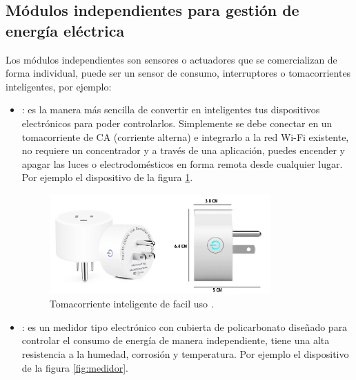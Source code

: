 \subsection{Módulos independientes para gestión de energía eléctrica}
Los módulos independientes son sensores o actuadores  que se comercializan de forma individual, puede ser un sensor de consumo, interruptores o tomacorrientes inteligentes, por ejemplo: 
\begin{itemize}

\item {}: es la manera más sencilla de convertir en inteligentes tus dispositivos electrónicos para poder controlarlos. Simplemente se debe conectar en un tomacorriente de CA (corriente alterna) e integrarlo a la red Wi-Fi existente, no requiere un concentrador y a través de una aplicación, puedes encender y apagar las luces o electrodomésticos en forma remota desde cualquier lugar. Por ejemplo el dispositivo de la figura \ref{fig:tomacorriente}.

\begin{figure}[htbp]
	\centering
\includegraphics[width=0.8\textwidth]{./Figures/tomacorriente.png}
	\caption{Tomacorriente inteligente de facil uso \protect\footnotemark.}
	\label{fig:tomacorriente}
\end{figure}





\item {}: es un medidor tipo electrónico con cubierta de policarbonato diseñado para controlar el consumo de energía de manera independiente, tiene una alta resistencia a la humedad, corrosión y temperatura. Por ejemplo el dispositivo de la figura \ref{fig:medidor}.


\end{itemize}
